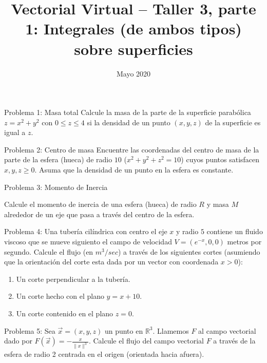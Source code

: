 \documentclass[usepdftitle=false]{beamer}
\title[]{Vectorial Virtual -- Taller 3, parte 1: Integrales (de ambos tipos) sobre superficies}
\date{Mayo 2020}
\begin{document}
\begin{frame}{Problema 1: Masa total}
Calcule la masa de la parte de la superficie parab\'olica $z=x^2+y^2$ con $0\leq z\leq 4$ si la densidad de un punto $(x,y,z)$ de la superficie es igual a $z$.
\end{frame}

\begin{frame}{Problema 2: Centro de masa}
Encuentre las coordenadas del centro de masa de la parte de la esfera (hueca) de radio $10$ ($x^2+y^2+z^2=10$) cuyos puntos satisfacen $x,y,z\geq 0$. Asuma que la densidad de un punto en la esfera es constante.

\end{frame}

\begin{frame} {Problema 3: Momento de Inercia}

Calcule el momento de inercia de una esfera (hueca) de radio $R$ y masa $M$ alrededor de un eje que pasa a trav\'es del centro de la esfera.
\end{frame}

\begin{frame}{Problema 4: }
Una tuber\'ia cil\'indrica con centro el eje $x$ y radio $5$ contiene un fluido viscoso que se mueve siguiento el campo de velocidad $V=\left(e^{-x},0,0\right)$ metros por segundo. Calcule el flujo (en $m^3/sec$) a trav\'es de los siguientes cortes (asumiendo que la orientaci\'on del corte esta dada por un vector con coordenada $x>0$):
\begin{enumerate}
\item Un corte perpendicular a la tuber\'ia.
\item Un corte hecho con el plano $y=x+10$.
\item Un corte contenido en el plano $z=0$.
\end{enumerate} 
\end{frame}

\begin{frame}{Problema 5: }
Sea $\vec{x}=(x,y,z)$ un punto en $\mathbb{R}^3$. Llamemos $F$ al campo vectorial dado por $F(\vec{x})=-\frac{x}{\|x\|^3}$.
Calcule el flujo del campo vectorial $F$ a trav\'es de la esfera de radio 2 centrada en el origen (orientada hacia afuera).

\end{frame}
\end{document}
